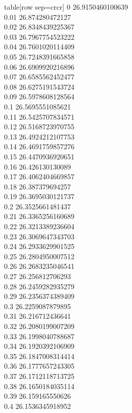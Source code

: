   table[row sep=crcr]{%
0	26.9150460100639\\
0.01	26.874280472127\\
0.02	26.8348439225367\\
0.03	26.7967754523222\\
0.04	26.7601020114409\\
0.05	26.7248391665858\\
0.06	26.6909920216896\\
0.07	26.6585562452477\\
0.08	26.6275191543724\\
0.09	26.5978608128564\\
0.1	26.5695551085621\\
0.11	26.5425707834571\\
0.12	26.5168723970755\\
0.13	26.4924212107753\\
0.14	26.4691759857276\\
0.15	26.4470936920651\\
0.16	26.426130130089\\
0.17	26.4062404669857\\
0.18	26.387379694257\\
0.19	26.3695030121737\\
0.2	26.3525661481437\\
0.21	26.3365256160689\\
0.22	26.3213389236604\\
0.23	26.3069647343703\\
0.24	26.2933629901525\\
0.25	26.2804950007512\\
0.26	26.2683235046541\\
0.27	26.256812706293\\
0.28	26.2459282935279\\
0.29	26.2356374389409\\
0.3	26.2259087879895\\
0.31	26.216712436641\\
0.32	26.2080199007209\\
0.33	26.1998040788687\\
0.34	26.1920392106909\\
0.35	26.1847008314414\\
0.36	26.1777657243305\\
0.37	26.1712118713725\\
0.38	26.1650184035114\\
0.39	26.159165550626\\
0.4	26.1536345918952\\
}
